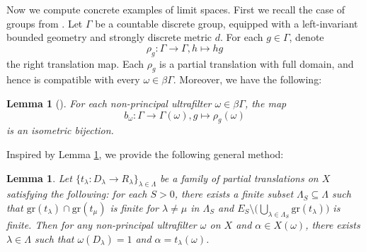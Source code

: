 \documentclass[12pt, a4paper]{amsart}
\numberwithin{equation}{section}
\newtheorem{lem}[thm]{Lemma}
\theoremstyle{definition}
\theoremstyle{remark}
\def\gr{\mathrm{gr}}
\begin{document}
Now we compute concrete examples of limit spaces. First we recall the case of groups from \cite[Appendix B]{SW17}. Let $\Gamma$ be a countable discrete group, equipped with a left-invariant bounded geometry and strongly discrete metric $d$. For each $g\in \Gamma$, denote 
\[
\rho_g: \Gamma \to \Gamma, h \mapsto hg
\]
the right translation map. Each $\rho_g$ is a partial translation with full domain, and hence is compatible with every $\omega \in \beta \Gamma$. Moreover, we have the following:

\begin{lem}[{\cite[Lemma B.1]{SW17}}]\label{lem:limit space for group case}
For each non-principal ultrafilter $\omega \in \beta \Gamma$, the map
\[
b_\omega: \Gamma \longrightarrow \Gamma(\omega), g \mapsto \rho_g(\omega)
\]
is an isometric bijection.
\end{lem}

Inspired by Lemma \ref{lem:limit space for group case}, we provide the following general method:

\begin{lem}\label{lem:limit space general case}
Let $\{t_\lambda: D_\lambda \to R_\lambda\}_{\lambda \in \Lambda}$ be a family of partial translations on $X$ satisfying the following: for each $S>0$, there exists a finite subset $\Lambda_S \subseteq \Lambda$ such that $\gr(t_{\lambda}) \cap \gr(t_\mu)$ is finite for $\lambda \neq \mu$ in $\Lambda_S$ and $E_S \setminus \big( \bigcup_{\lambda \in \Lambda_S} \gr(t_\lambda) \big)$ is finite. Then for any non-principal ultrafilter $\omega$ on $X$ and $\alpha \in X(\omega)$, there exists $\lambda \in \Lambda$ such that $\omega(D_\lambda)=1$ and $\alpha = t_\lambda(\omega)$.
\end{lem}
\end{document}
